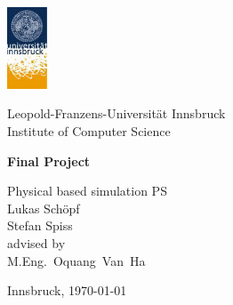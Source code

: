 \documentclass[11pt,a4paper]{article}
\begin{document}

\begin{titlepage} %

\begin{center}
\includegraphics[width=1.2cm]{images/uibk}

\begin{large}
Leopold-Franzens-Universit\"at Innsbruck\\[5mm]
Institute of Computer Science\\
\end{large}

{\LARGE \bf Final Project}

Physical based simulation PS\\[20mm]

Lukas Sch\"opf\\Stefan Spiss\\[35mm]

advised by\\
M.Eng.~Oquang~Van~Ha\\[10mm]

\vfill

Innsbruck, \today
\end{center}

\end{titlepage}


\end{document}
